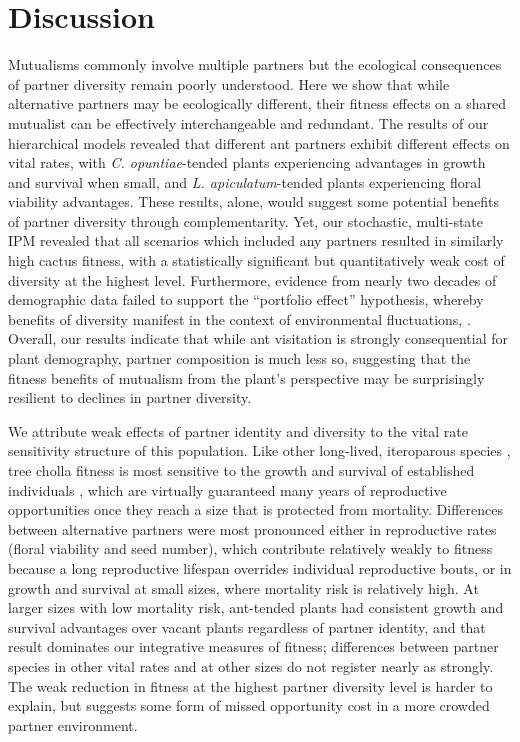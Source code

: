 \documentclass[11pt]{article}
\newcommand{\revise}[1]{{\color{blue}{#1}}}
\begin{document}
\section*{Discussion}
Mutualisms commonly involve multiple partners but the ecological consequences of partner diversity remain poorly understood. 
Here we show that while alternative partners may be ecologically different, their fitness effects on a shared mutualist can be effectively interchangeable and redundant.
The results of our hierarchical models revealed that different ant partners exhibit different effects on vital rates, with \textit{C. opuntiae}-tended plants experiencing advantages in growth and survival when small, and \textit{L. apiculatum}-tended plants experiencing floral viability advantages. 
These results, alone, would suggest some potential benefits of partner diversity through complementarity.  
Yet, our stochastic, multi-state IPM revealed that all scenarios which included any partners resulted in similarly high cactus fitness, with a statistically significant but quantitatively weak cost of diversity at the highest level. 
Furthermore, evidence from nearly two decades of demographic data failed to support the ``portfolio effect'' hypothesis, whereby benefits of diversity manifest in the context of environmental fluctuations, \revise{because fluctuations in the demographic effects of alternative partners are too synchronized}. 
Overall, our results indicate that while ant visitation is strongly consequential for plant demography, partner composition is much less so, suggesting that the fitness benefits of mutualism from the plant's perspective may be surprisingly resilient to declines in partner diversity. 

We attribute weak effects of partner identity and diversity to the vital rate sensitivity structure of this population. 
Like other long-lived, iteroparous species \citep{Franco2004}, tree cholla fitness is most sensitive to the growth and survival of established individuals \citep{Miller2009,elderd2016quantifying}, which are virtually guaranteed many years of reproductive opportunities once they reach a size that is protected from mortality. 
Differences between alternative partners were most pronounced either in reproductive rates (floral viability and seed number), which contribute relatively weakly to fitness because a long reproductive lifespan overrides individual reproductive bouts, or in growth and survival at small sizes, where mortality risk is relatively high. 
At larger sizes with low mortality risk, ant-tended plants had consistent growth and survival advantages over vacant plants regardless of partner identity, and that result dominates our integrative measures of fitness; differences between partner species in other vital rates and at other sizes do not register nearly as strongly. 
The weak reduction in fitness at the highest partner diversity level is harder to explain, but suggests some form of missed opportunity cost in a more crowded partner environment. 
\end{document}
